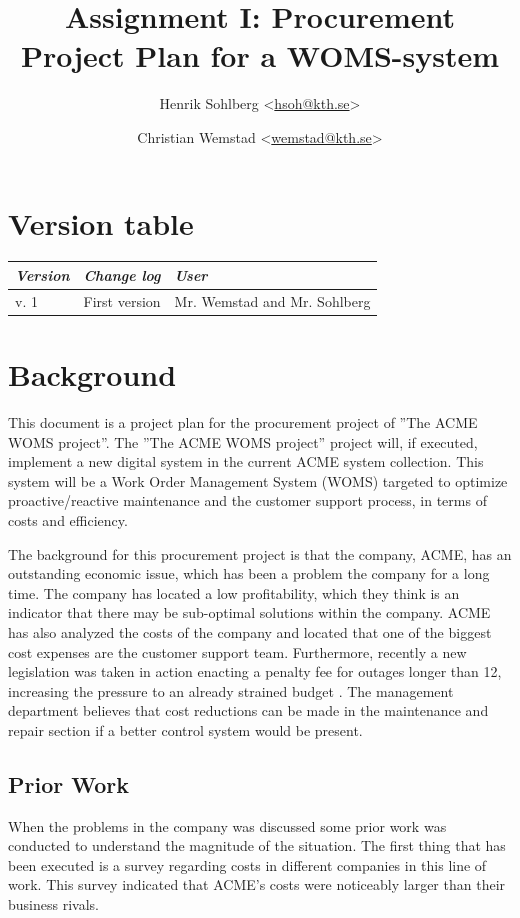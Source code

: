 \documentclass[a4paper]{article}
\title{Assignment I: Procurement Project Plan for a WOMS-system}
\author{Henrik Sohlberg <\href{mailto:hsoh@kth.se}{hsoh@kth.se}> %
\and Christian Wemstad <\href{mailto:wemstad@kth.se}{wemstad@kth.se}> %
}
\begin{document}
\pagestyle{empty}
\maketitle

\newpage
\section*{Version table}
\label{sec:version_tabel}
\begin{table}[H]
	\centering
	\begin{tabular}{|l|l|l|}
		\hline
			\textit{Version} & \textit{Change log} & \textit{User}\\
		\hline
		     v. 1 & First version & Mr. Wemstad and Mr. Sohlberg \\
		\hline
	\end{tabular}
\end{table}
\newpage       
\tableofcontents
\newpage
\pagestyle{fancy}
\setcounter{page}{1}
\section{Background}
\label{sec:background}
This document is a project plan for the procurement project of ''The ACME WOMS project''. The ''The ACME WOMS project'' project will, if executed, implement a new digital system in the current ACME system collection. This system will be a Work Order Management System (WOMS) targeted to optimize proactive/reactive maintenance and the customer support process, in terms of costs and efficiency.

The background for this procurement project is that the company, ACME, has an outstanding economic issue, which has been a problem the company for a long time. The company has located a low profitability, which they think is an indicator that there may be sub-optimal solutions within the company. ACME has also analyzed the costs of the company and located that one of the biggest cost expenses are the customer support team. Furthermore, recently a new legislation was taken in action enacting a penalty fee for outages longer than 12, increasing the pressure to an already strained budget . The management department believes that cost reductions can be made in the maintenance and repair section if a better control system would be present. 

\subsection{Prior Work}
\label{sub:prior_work}
When the problems in the company was discussed some prior work was conducted to understand the magnitude of the situation. The first thing that has been executed is a survey regarding costs in different companies in this line of work. This survey indicated that ACME's costs were noticeably larger than their business rivals.
\end{document}
